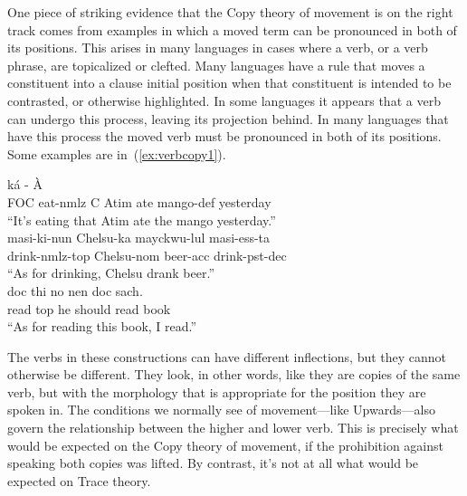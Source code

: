 One piece of striking evidence that the Copy theory of movement is on the right track comes from examples in which a moved term can be pronounced in both of its positions. This arises in many languages in cases where a verb, or a verb phrase, are topicalized or clefted. Many languages have a rule that moves a constituent into a clause initial position when that constituent is intended to be contrasted, or otherwise highlighted. In some languages it appears that a verb can undergo this process, leaving its projection behind. In many languages that have this process the moved verb must be pronounced in both of its positions. Some examples are in~(\ref{ex:verbcopy1}).
\begin{exe}
\raggedright
	\ex \label{ex:verbcopy1}
	\begin{xlist}
		\ex \gll k{\'a} -  \`A   \\ FOC eat-nmlz C Atim ate mango-def yesterday\\ ``It's eating that Atim ate the mango yesterday.''\\ \hfill \citep[\emph{Buli,}][p. 262]{Hiraiwa:2005}\hfill\hspace*{.15in}
		\ex \gll masi-ki-nun Chelsu-ka mayckwu-lul masi-ess-ta\\ drink-nmlz-top Chelsu-nom beer-acc drink-pst-dec\\ ``As for drinking, Chelsu drank beer.''\\ \hfill \citep[\emph{Korean,}][p. 90]{Jo:2000}\hfill\hspace*{.15in}
		\ex \gll doc thi no nen doc sach.\\ read top he should read book\\ ``As for reading this book, I read.''\\
		\hfill \citep[\emph{Vietnamese,}][p. 60]{Trinh:2011}\hfill\hspace*{.15in}
	\end{xlist}
\end{exe}
The verbs in these constructions can have different inflections, but they cannot otherwise be different. They look, in other words, like they are copies of the same verb, but with the morphology that is appropriate for the position they are spoken in. The conditions we normally see of movement---like Upwards---also govern the relationship between the higher and lower verb. This is precisely what would be expected on the Copy theory of movement, if the prohibition against speaking both copies was lifted. By contrast, it's not at all what would be expected on Trace theory. 
